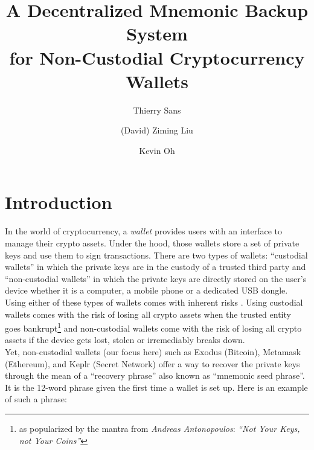 \documentclass[runningheads]{llncs}
\begin{document}
\title{A Decentralized Mnemonic Backup System\\ for Non-Custodial Cryptocurrency Wallets}

\author{Thierry Sans \and
(David) Ziming Liu\and
Kevin Oh}


\maketitle             

\begin{abstract}



\end{abstract}

\section{Introduction}

In the world of cryptocurrency, a {\em wallet} provides users with an interface to manage their crypto assets. Under the hood, those wallets store a set of private keys and use them to sign transactions. There are two types of wallets: ``custodial wallets'' in which the private keys are in the custody of a trusted third party and ``non-custodial wallets'' in which the private keys are directly stored on the user's device whether it is a computer, a mobile phone or a dedicated USB dongle. Using either of these types of wallets comes with inherent risks \cite{azar2022financial}. Using custodial wallets comes with the risk of losing all crypto assets when the trusted entity goes bankrupt\footnote{as popularized by the mantra from {\em Andreas Antonopoulos}: {\em ``Not Your Keys, not Your Coins''}} and non-custodial wallets come with the risk of losing all crypto assets if the device gets lost, stolen or irremediably breaks down. \\

Yet, non-custodial wallets (our focus here) such as Exodus (Bitcoin), Metamask (Ethereum), and Keplr (Secret Network) offer a way to recover the private keys through the mean of a ``recovery phrase'' also known as ``mnemonic seed phrase''. It is the 12-word phrase given the first time a wallet is set up. Here is an example of such a phrase: 
\end{document}
